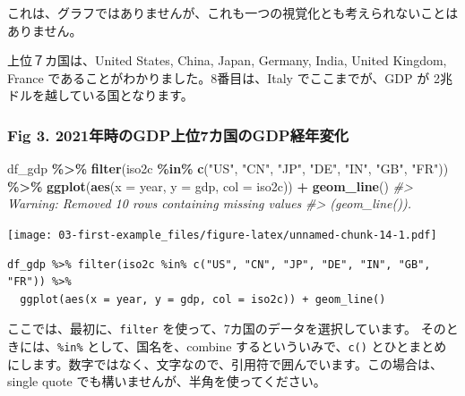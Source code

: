 \documentclass[
  xelatex, ja=standard]{bxjsbook}
\newenvironment{Shaded}{\begin{snugshade}}{\end{snugshade}}
\newcommand{\AttributeTok}[1]{\textcolor[rgb]{0.13,0.29,0.53}{#1}}
\newcommand{\CommentTok}[1]{\textcolor[rgb]{0.56,0.35,0.01}{\textit{#1}}}
\newcommand{\FunctionTok}[1]{\textcolor[rgb]{0.13,0.29,0.53}{\textbf{#1}}}
\newcommand{\NormalTok}[1]{#1}
\newcommand{\SpecialCharTok}[1]{\textcolor[rgb]{0.81,0.36,0.00}{\textbf{#1}}}
\newcommand{\StringTok}[1]{\textcolor[rgb]{0.31,0.60,0.02}{#1}}
\theoremstyle{definition}
\theoremstyle{definition}
\theoremstyle{definition}
\theoremstyle{definition}
\theoremstyle{remark}
\begin{document}
これは、グラフではありませんが、これも一つの視覚化とも考えられないことはありません。

上位７カ国は、United States, China, Japan, Germany, India, United Kingdom, France であることがわかりました。8番目は、Italy でここまでが、GDP が 2兆ドルを越している国となります。

\hypertarget{fig-3.-2021ux5e74ux6642ux306egdpux4e0aux4f4d7ux30abux56fdux306egdpux7d4cux5e74ux5909ux5316}{%
\subsubsection{Fig 3. 2021年時のGDP上位7カ国のGDP経年変化}\label{fig-3.-2021ux5e74ux6642ux306egdpux4e0aux4f4d7ux30abux56fdux306egdpux7d4cux5e74ux5909ux5316}}

\begin{Shaded}
\begin{Highlighting}[]
\NormalTok{df\_gdp }\SpecialCharTok{\%\textgreater{}\%} \FunctionTok{filter}\NormalTok{(iso2c }\SpecialCharTok{\%in\%} \FunctionTok{c}\NormalTok{(}\StringTok{"US"}\NormalTok{, }\StringTok{"CN"}\NormalTok{, }\StringTok{"JP"}\NormalTok{, }\StringTok{"DE"}\NormalTok{, }\StringTok{"IN"}\NormalTok{, }\StringTok{"GB"}\NormalTok{, }\StringTok{"FR"}\NormalTok{)) }\SpecialCharTok{\%\textgreater{}\%}
  \FunctionTok{ggplot}\NormalTok{(}\FunctionTok{aes}\NormalTok{(}\AttributeTok{x =}\NormalTok{ year, }\AttributeTok{y =}\NormalTok{ gdp, }\AttributeTok{col =}\NormalTok{ iso2c)) }\SpecialCharTok{+} \FunctionTok{geom\_line}\NormalTok{()}
\CommentTok{\#\textgreater{} Warning: Removed 10 rows containing missing values}
\CommentTok{\#\textgreater{} (\textasciigrave{}geom\_line()\textasciigrave{}).}
\end{Highlighting}
\end{Shaded}

\texttt{[image: 03-first-example\_files/figure-latex/unnamed-chunk-14-1.pdf]}

\begin{verbatim}
df_gdp %>% filter(iso2c %in% c("US", "CN", "JP", "DE", "IN", "GB", "FR")) %>%
  ggplot(aes(x = year, y = gdp, col = iso2c)) + geom_line()
\end{verbatim}

ここでは、最初に、\texttt{filter} を使って、7カ国のデータを選択しています。 そのときには、\texttt{\%in\%} として、国名を、combine するといういみで、\texttt{c()} とひとまとめにします。数字ではなく、文字なので、引用符で囲んでいます。この場合は、single quote でも構いませんが、半角を使ってください。
\end{document}
